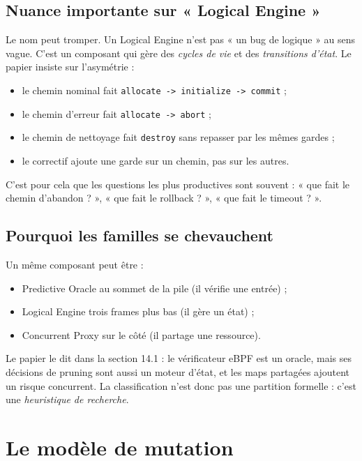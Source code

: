 \documentclass{training}
\begin{document}
\section*{Nuance importante sur « Logical Engine »}

Le nom peut tromper. Un Logical Engine n'est pas « un bug de logique » au
sens vague. C'est un composant qui gère des \emph{cycles de vie} et des
\emph{transitions d'état}. Le papier insiste sur l'asymétrie :

\begin{itemize}
  \item le chemin nominal fait \texttt{allocate -> initialize -> commit} ;
  \item le chemin d'erreur fait \texttt{allocate -> abort} ;
  \item le chemin de nettoyage fait \texttt{destroy} sans repasser par les
        mêmes gardes ;
  \item le correctif ajoute une garde sur un chemin, pas sur les autres.
\end{itemize}

C'est pour cela que les questions les plus productives sont souvent :
« que fait le chemin d'abandon ? », « que fait le rollback ? », « que fait le
timeout ? ».

\section*{Pourquoi les familles se chevauchent}

Un même composant peut être :

\begin{itemize}
  \item Predictive Oracle au sommet de la pile (il vérifie une entrée) ;
  \item Logical Engine trois frames plus bas (il gère un état) ;
  \item Concurrent Proxy sur le côté (il partage une ressource).
\end{itemize}

Le papier le dit dans la section 14.1 : le vérificateur eBPF est un oracle,
mais ses décisions de pruning sont aussi un moteur d'état, et les maps
partagées ajoutent un risque concurrent. La classification n'est donc pas une
partition formelle : c'est une \emph{heuristique de recherche}.

\chapter{Le modèle de mutation}
\end{document}
